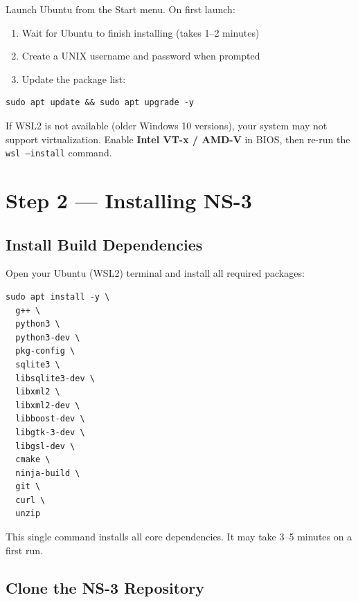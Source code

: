 \documentclass[12pt,a4paper]{article}
\newenvironment{warnbox}
  {\begin{tcolorbox}[
      colback   = warnyellow!15,
      colframe  = warnyellow!80!black,
      fonttitle = \bfseries,
      title     = \textcolor{warnyellow!80!black}{$\triangle$\; Warning},
      breakable
  ]}
  {\end{tcolorbox}}
\newenvironment{tipbox}
  {\begin{tcolorbox}[
      colback   = successgreen!8,
      colframe  = successgreen,
      fonttitle = \bfseries,
      title     = \textcolor{successgreen}{$\checkmark$\; Tip},
      breakable
  ]}
  {\end{tcolorbox}}
\newcommand{\cmd}[1]{\texttt{\color{codeblue}#1}}
\begin{document}
Launch Ubuntu from the Start menu. On first launch:
\begin{enumerate}[leftmargin=1.5em]
  \item Wait for Ubuntu to finish installing (takes 1--2 minutes)
  \item Create a UNIX username and password when prompted
  \item Update the package list:
\end{enumerate}

\begin{lstlisting}[style=bash, caption={Update Ubuntu packages}]
sudo apt update && sudo apt upgrade -y
\end{lstlisting}

\begin{warnbox}
If WSL2 is not available (older Windows 10 versions), your system may not support virtualization. Enable \textbf{Intel VT-x / AMD-V} in BIOS, then re-run the \cmd{wsl --install} command.
\end{warnbox}


\section{Step 2 — Installing NS-3}

\subsection{Install Build Dependencies}

Open your Ubuntu (WSL2) terminal and install all required packages:

\begin{lstlisting}[style=bash, caption={Install NS-3 build dependencies (Ubuntu 22.04)}]
sudo apt install -y \
  g++ \
  python3 \
  python3-dev \
  pkg-config \
  sqlite3 \
  libsqlite3-dev \
  libxml2 \
  libxml2-dev \
  libboost-dev \
  libgtk-3-dev \
  libgsl-dev \
  cmake \
  ninja-build \
  git \
  curl \
  unzip
\end{lstlisting}

\begin{tipbox}
This single command installs all core dependencies. It may take 3--5 minutes on a first run.
\end{tipbox}

\subsection{Clone the NS-3 Repository}
\end{document}
